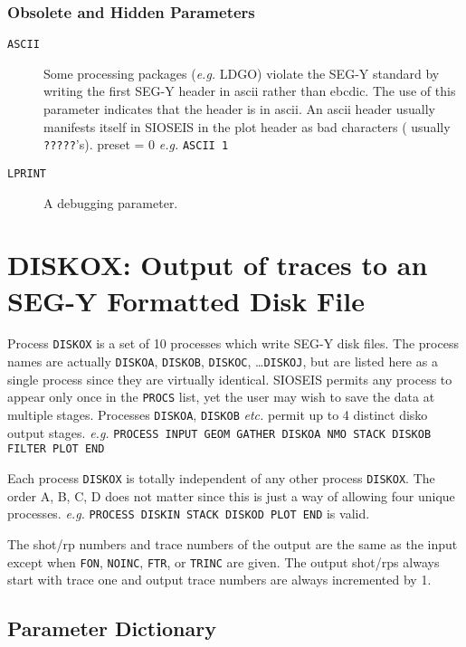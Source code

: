 \subsubsection{Obsolete and Hidden Parameters}
\begin{description}
\item[\texttt{ASCII}] Some processing packages (\textit{e.g.} LDGO) violate the SEG-Y
         standard by writing the first SEG-Y header in \gls{ascii}
         rather than \gls{ebcdic}.   The use of this parameter
         indicates that the header is in \gls{ascii}.   An \gls{ascii} header
         usually manifests itself in SIOSEIS in the plot header as
         bad characters ( usually \texttt{?????}'s).
         \Gls{preset} = 0     \textit{e.g.}  \texttt{ASCII 1}

     \item[\texttt{LPRINT}] A debugging parameter.
\end{description}

\section{DISKOX: Output of traces to an SEG-Y Formatted Disk File}
\label{cmd_diskox}

Process \texttt{DISKOX} is a set of 10 processes which write SEG-Y disk files.
The process names are actually \texttt{DISKOA}, \texttt{DISKOB}, \texttt{DISKOC}, \ldots \texttt{DISKOJ}, but
are listed here as a single process since they are virtually identical.
SIOSEIS permits any process to appear only once in the \texttt{PROCS} list, yet
the user may wish to save the data at multiple stages.  Processes
\texttt{DISKOA}, \texttt{DISKOB} \textit{etc.} permit up to 4 distinct disko output stages.  \textit{e.g.}
\texttt{PROCESS INPUT GEOM GATHER DISKOA NMO STACK DISKOB FILTER PLOT END}

Each process \texttt{DISKOX} is totally independent of any other process \texttt{DISKOX}.
The order A, B, C, D does not matter since this is just a way of allowing
four unique processes.  \textit{e.g.} \texttt{PROCESS DISKIN STACK DISKOD PLOT END} is
valid.

The \gls{shot}/\gls{rp} numbers and trace numbers of the output are the same as the
input except when \texttt{FON}, \texttt{NOINC}, \texttt{FTR}, or \texttt{TRINC} are given.  The output
shot/\glspl{rp} always start with trace one and output trace numbers are always
incremented by 1.

\subsection{Parameter Dictionary}

